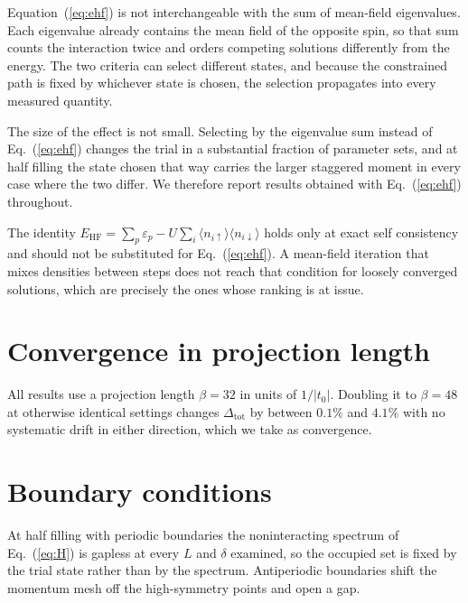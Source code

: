 \documentclass[aps,prb,reprint,superscriptaddress,amsmath,amssymb,floatfix]{revtex4-2}
\begin{document}
Equation~(\ref{eq:ehf}) is not interchangeable with the sum of mean-field
eigenvalues. Each eigenvalue already contains the mean field of the opposite
spin, so that sum counts the interaction twice and orders competing solutions
differently from the energy. The two criteria can select different states, and
because the constrained path is fixed by whichever state is chosen, the
selection propagates into every measured quantity.

The size of the effect is not small. Selecting by the eigenvalue sum instead of
Eq.~(\ref{eq:ehf}) changes the trial in a substantial fraction of parameter
sets, and at half filling the state chosen that way carries the larger staggered
moment in every case where the two differ. We therefore report results obtained
with Eq.~(\ref{eq:ehf}) throughout.

The identity $E_{\mathrm{HF}} = \sum_p \varepsilon_p - U \sum_i \langle
n_{i\uparrow}\rangle \langle n_{i\downarrow}\rangle$ holds only at exact self
consistency and should not be substituted for Eq.~(\ref{eq:ehf}). A mean-field
iteration that mixes densities between steps does not reach that condition for
loosely converged solutions, which are precisely the ones whose ranking is at
issue.

\section{Convergence in projection length}
\label{app:beta}

All results use a projection length $\beta = 32$ in units of $1/|t_0|$. Doubling
it to $\beta = 48$ at otherwise identical settings changes
$\Delta_{\mathrm{tot}}$ by between $0.1\%$ and $4.1\%$ with no systematic drift
in either direction, which we take as convergence.

\section{Boundary conditions}
\label{app:bc}

At half filling with periodic boundaries the noninteracting spectrum of
Eq.~(\ref{eq:H}) is gapless at every $L$ and $\delta$ examined, so the occupied
set is fixed by the trial state rather than by the spectrum. Antiperiodic
boundaries shift the momentum mesh off the high-symmetry points and open a gap.
\end{document}
